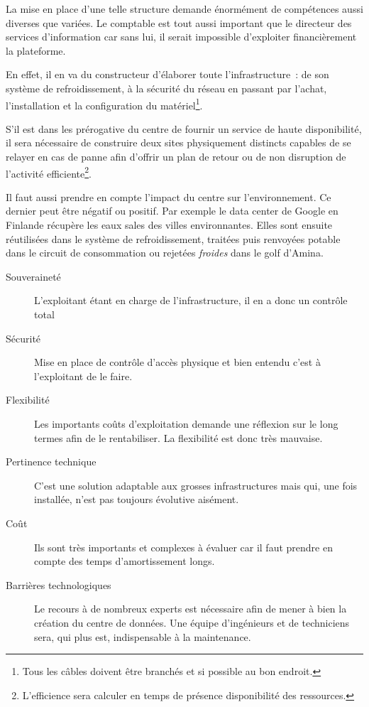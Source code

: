 \documentclass[11pt, a4paper ]{article}
\begin{document}
\begin{spacing}{1.5}
La mise en place d'une telle structure demande énormément de compétences aussi diverses que variées. Le comptable est tout aussi important que le directeur des services d'information car sans lui, il serait impossible d'exploiter financièrement la plateforme.

En effet, il en va du constructeur d'élaborer toute l'infrastructure : de son système de refroidissement, à la sécurité du réseau en passant par l'achat, l'installation et la configuration du matériel\footnote{Tous les câbles doivent être branchés et si possible au bon endroit.}.

S'il est dans les prérogative du centre de fournir un service de haute disponibilité, il sera nécessaire de construire deux sites physiquement distincts capables de se relayer en cas de panne afin d'offrir un plan de retour ou de non disruption de l'activité efficiente\footnote{L'efficience sera calculer en temps de présence disponibilité des ressources.}.

Il faut aussi prendre en compte l'impact du centre sur l'environnement. Ce dernier peut être négatif ou positif. Par exemple le data center de Google en Finlande récupère les eaux sales des villes environnantes. Elles sont ensuite réutilisées dans le système de refroidissement, traitées puis renvoyées potable dans le circuit de consommation ou rejetées \emph{froides} dans le golf d’Amina.



\begin{description}
	\item[Souveraineté ]
L'exploitant étant en charge de l'infrastructure, il en a donc un contrôle total 
	\item[Sécurité]
Mise en place de contrôle d’accès physique et bien entendu c'est à l'exploitant de le faire.
	\item[Flexibilité]
 Les importants coûts d'exploitation demande une réflexion sur le long termes afin de le rentabiliser.  La flexibilité est donc très mauvaise.
	\item[Pertinence technique]
 C'est une solution adaptable aux grosses infrastructures mais qui, une fois installée, n'est pas toujours évolutive aisément. 
	\item[Coût]
Ils sont très importants et complexes à évaluer car il faut prendre en compte des temps d'amortissement longs.
	\item[Barrières technologiques]
	Le recours à de nombreux experts est nécessaire afin de mener à bien la création du centre de données. Une équipe d'ingénieurs et de techniciens sera, qui plus est, indispensable à la maintenance. 
\end{description}


\end{spacing}
\end{document}

